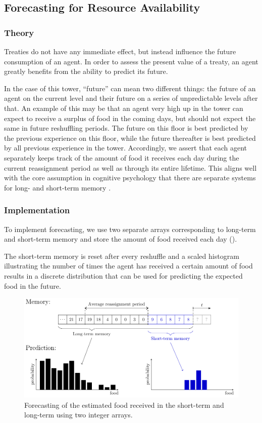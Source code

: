 \subsection{Forecasting for Resource Availability} \label{sec:forecasting}

\subsubsection{Theory}

Treaties do not have any immediate effect, but instead influence the future consumption of an agent. In order to assess the present value of a treaty, an agent greatly benefits from the ability to predict its future.

In the case of this tower, ``future'' can mean two different things: the future of an agent on the current level and their future on a series of unpredictable levels after that. An example of this may be that an agent very high up in the tower can expect to receive a surplus of food in the coming days, but should not expect the same in future reshuffling periods. The future on this floor is best predicted by the previous experience on this floor, while the future thereafter is best predicted by all previous experience in the tower. Accordingly, we assert that each agent separately keeps track of the amount of food it receives each day during the current reassignment period as well as through its entire lifetime. This aligns well with the core assumption in cognitive psychology that there are separate systems for long- and short-term memory \cite{norris2017short}.

\subsubsection{Implementation}
To implement forecasting, we use two separate arrays corresponding to long-term and short-term memory and store the amount of food received each day ().

The short-term memory is reset after every reshuffle and a scaled histogram illustrating the number of times the agent has received a certain amount of food results in a discrete distribution that can be used for predicting the expected food in the future.

\begin{figure} [htb]
    \centering
    \includegraphics[width=0.9\linewidth]{008_team_6_agent_design/SOMAS_forecasting.pdf}
    \caption{Forecasting of the estimated food received in the short-term and long-term using two integer arrays.}
    \label{fig:forecasting}
\end{figure}

